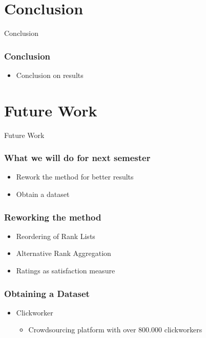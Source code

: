 \section{Conclusion}

\begin{frame}
	\begin{center}
		\huge Conclusion
	\end{center}
\end{frame}

\begin{frame}
	\frametitle{Conclusion}
	\begin{itemize}
		\item Conclusion on results
	\end{itemize}
\end{frame}

\section{Future Work}

\begin{frame}
	\begin{center}
		\huge Future Work
	\end{center}
\end{frame}

\begin{frame}
	\frametitle{What we will do for next semester}
	\begin{itemize}
		\item Rework the method for better results
		\item Obtain a dataset
	\end{itemize}
\end{frame}

\begin{frame}
	\frametitle{Reworking the method}
	\begin{itemize}
		\item Reordering of Rank Lists
		\item Alternative Rank Aggregation
		\item Ratings as satisfaction measure
	\end{itemize}
\end{frame}

\begin{frame}
	\frametitle{Obtaining a Dataset}
	\begin{itemize}
		\item Clickworker
		\begin{itemize}
			\item Crowdsourcing platform with over 800.000 clickworkers
		\end{itemize}
	\end{itemize}
\end{frame}


